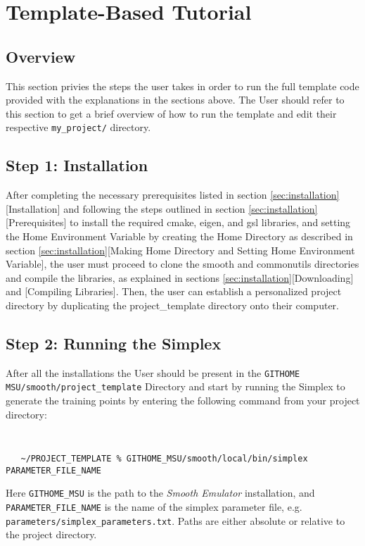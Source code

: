 \documentclass[UserManual.tex]{subfiles}
\begin{document}
\setcounter{section}{7}
\section{Template-Based Tutorial}\label{sec:tutorial}

\subsection{Overview}
This section privies the steps the user takes in order to run the full template code provided with the explanations in the sections above. The User should refer to this section to get a brief overview of how to run the template and edit their respective {\tt my\_project/} directory.

\subsection{Step 1: Installation}
After completing the necessary prerequisites listed in section \ref{sec:installation}[Installation] and following the steps outlined in section \ref{sec:installation}[Prerequisites] to install the required cmake, eigen, and gsl libraries, and setting the Home Environment Variable by creating the Home Directory as described in section \ref{sec:installation}[Making Home Directory and Setting Home Environment Variable], the user must proceed to clone the smooth and commonutils directories and compile the libraries, as explained in sections \ref{sec:installation}[Downloading] and [Compiling Libraries]. Then, the user can establish a personalized project directory by duplicating the project\_template directory onto their computer.

\subsection{Step 2: Running the Simplex}

After all the installations the User should be present in the  {\tt GITHOME MSU/smooth/project\_template} Directory and start by running the Simplex to generate the training points by entering the following command from your project directory:
{\tt
\begin{verbatim}
   ~/PROJECT_TEMPLATE % GITHOME_MSU/smooth/local/bin/simplex PARAMETER_FILE_NAME
\end{verbatim}
}
Here {\tt GITHOME\_MSU} is the path to the {\it Smooth Emulator} installation, and {\tt PARAMETER\_FILE\_NAME} is the name of the simplex parameter file, e.g. {\tt parameters/simplex\_parameters.txt}. Paths are either absolute or relative to the project directory.
\end{document}
